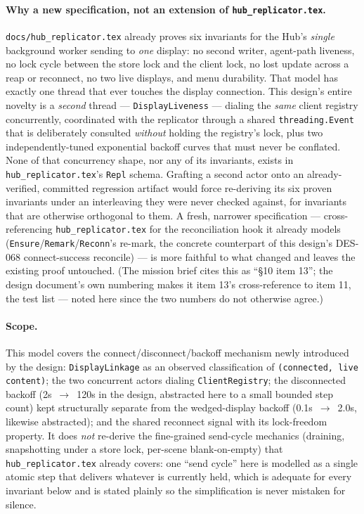 \documentclass[a4paper,10pt,fleqn]{article}
\begin{document}
\paragraph{Why a new specification, not an extension of \texttt{hub\_replicator.tex}.}
\texttt{docs/hub\_replicator.tex} already proves six invariants for the
Hub's \emph{single} background worker sending to \emph{one} display: no
second writer, agent-path liveness, no lock cycle between the store lock and
the client lock, no lost update across a reap or reconnect, no two live
displays, and menu durability.  That model has exactly one thread that ever
touches the display connection.  This design's entire novelty is a
\emph{second} thread --- \texttt{DisplayLiveness} --- dialing the
\emph{same} client registry concurrently, coordinated with the replicator
through a shared \texttt{threading.Event} that is deliberately consulted
\emph{without} holding the registry's lock, plus two independently-tuned
exponential backoff curves that must never be conflated.  None of that
concurrency shape, nor any of its invariants, exists in
\texttt{hub\_replicator.tex}'s \texttt{Repl} schema.  Grafting a second actor
onto an already-verified, committed regression artifact would force
re-deriving its six proven invariants under an interleaving they were never
checked against, for invariants that are otherwise orthogonal to them.  A
fresh, narrower specification --- cross-referencing
\texttt{hub\_replicator.tex} for the reconciliation hook it already models
(\texttt{Ensure}/\texttt{Remark}/\texttt{Reconn}'s re-mark, the concrete
counterpart of this design's DES-068 connect-success reconcile) --- is more
faithful to what changed and leaves the existing proof untouched.  (The
mission brief cites this as ``\S10 item 13''; the design document's own
numbering makes it item 13's cross-reference to item 11, the test list ---
noted here since the two numbers do not otherwise agree.)

\paragraph{Scope.} This model covers the connect/disconnect/backoff
mechanism newly introduced by the design: \texttt{DisplayLinkage} as an
observed classification of \texttt{(connected, live content)}; the two
concurrent actors dialing \texttt{ClientRegistry}; the disconnected backoff
(2s~$\to$~120s in the design, abstracted here to a small bounded step count)
kept structurally separate from the wedged-display backoff (0.1s~$\to$~2.0s,
likewise abstracted); and the shared reconnect signal with its
lock-freedom property.  It does \emph{not} re-derive the fine-grained
send-cycle mechanics (draining, snapshotting under a store lock, per-scene
blank-on-empty) that \texttt{hub\_replicator.tex} already covers: one
``send cycle'' here is modelled as a single atomic step that delivers
whatever is currently held, which is adequate for every invariant below and
is stated plainly so the simplification is never mistaken for silence.
\end{document}
